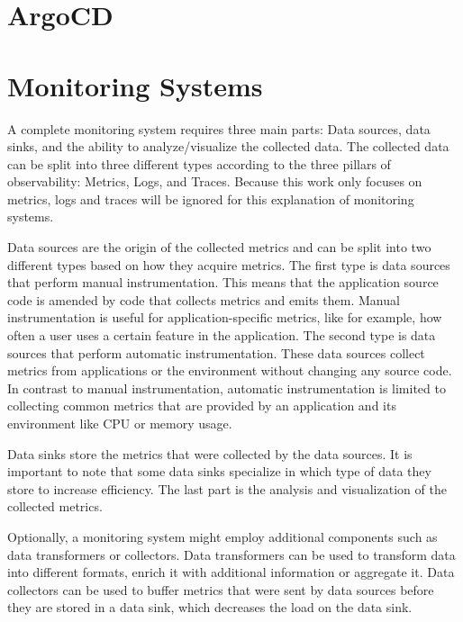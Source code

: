 \section{ArgoCD}
\label{sec:tech_argocd}


\cite{ARG-DOCS}

\section{Monitoring Systems}
\label{sec:tech_monitoring_systems}


A complete monitoring system requires three main parts: Data sources, data sinks, and the ability
to analyze/visualize the collected data.
The collected data can be split into three different types
according to the three pillars of observability: Metrics, Logs, and Traces.
Because this work only focuses on metrics, logs and traces will be ignored for this explanation of monitoring systems.

Data sources are the origin of the collected metrics and can be split into two different types
based on how they acquire metrics. The first type is data sources that perform manual instrumentation.
This means that the application source code is amended by code that collects metrics and emits them.
Manual instrumentation is useful for application-specific metrics, like for example, how often a user
uses a certain feature in the application.
The second type is data sources that perform automatic instrumentation.
These data sources collect metrics from applications or the environment without changing any source code.
In contrast to manual instrumentation, automatic instrumentation is limited to collecting
common metrics that are provided by an application and its environment like CPU or memory usage.

Data sinks store the metrics that were collected by the data sources.
It is important to note that some data sinks specialize in which type of data they store
to increase efficiency. The last part is the analysis and visualization of the collected metrics.

Optionally, a monitoring system might employ additional components such as data transformers or collectors.
Data transformers can be used to transform data into different formats, enrich it with additional information
or aggregate it.
Data collectors can be used to buffer metrics that were sent by data sources before they are stored in a data sink,
which decreases the load on the data sink.

